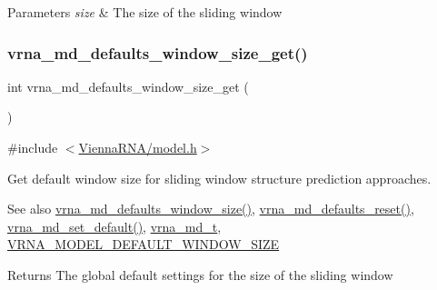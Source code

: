 \begin{DoxyParams}{Parameters}
{\em size} & The size of the sliding window \\
\hline
\end{DoxyParams}
\mbox{\label{group__model__details_ga670146a9aa3ba77f4d422d60b7c30ac9}} 
\subsubsection{\texorpdfstring{vrna\+\_\+md\+\_\+defaults\+\_\+window\+\_\+size\+\_\+get()}{vrna\_md\_defaults\_window\_size\_get()}}
{\footnotesize\ttfamily int vrna\+\_\+md\+\_\+defaults\+\_\+window\+\_\+size\+\_\+get (\begin{DoxyParamCaption}\item[{void}]{ }\end{DoxyParamCaption})}



{\ttfamily \#include $<$\mbox{\hyperlink{model_8h}{Vienna\+R\+N\+A/model.\+h}}$>$}



Get default window size for sliding window structure prediction approaches. 

\begin{DoxySeeAlso}{See also}
\mbox{\hyperlink{group__model__details_ga7b802ce0e8c3181bf5cb580de6d5b26a}{vrna\+\_\+md\+\_\+defaults\+\_\+window\+\_\+size()}}, \mbox{\hyperlink{group__model__details_ga70834424cf804d149937de89f80ceb45}{vrna\+\_\+md\+\_\+defaults\+\_\+reset()}}, \mbox{\hyperlink{group__model__details_ga8ac6ff84936282436f822644bf841f66}{vrna\+\_\+md\+\_\+set\+\_\+default()}}, \mbox{\hyperlink{group__model__details_ga1f8a10e12a0a1915f2a4eff0b28ea17c}{vrna\+\_\+md\+\_\+t}}, \mbox{\hyperlink{group__model__details_ga8de04a9cb57e811e313b0f9f207f6bdb}{V\+R\+N\+A\+\_\+\+M\+O\+D\+E\+L\+\_\+\+D\+E\+F\+A\+U\+L\+T\+\_\+\+W\+I\+N\+D\+O\+W\+\_\+\+S\+I\+ZE}} 
\end{DoxySeeAlso}
\begin{DoxyReturn}{Returns}
The global default settings for the size of the sliding window 
\end{DoxyReturn}
\mbox{\label{group__model__details_ga41521d5b9fb7e0f31e7ea73f5792afab}} 

